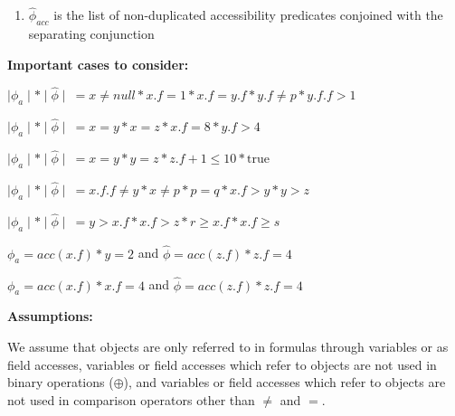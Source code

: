 \documentclass {article}
\newcommand{\true}{\text{true}}
\newcommand{\fphi}{\widehat{\phi}}
\begin{document}
\begin{enumerate}
\begin{enumerate}
	\end{enumerate}
\item $\fphi_{acc}$ is the list of non-duplicated accessibility predicates conjoined with the separating conjunction
\end{enumerate}

\textbf{Important cases to consider:}

$\mid \phi_a \mid \ast \mid \fphi \mid \ = x \neq null \ast x.f = 1 \ast x.f = y.f \ast y.f \neq p \ast y.f.f > 1$

$\mid \phi_a \mid \ast \mid \fphi \mid \ = x = y \ast x = z \ast x.f = 8 \ast y.f > 4$

$\mid \phi_a \mid \ast \mid \fphi \mid \ = x = y \ast y = z \ast z.f + 1 \leq 10 \ast \true$

$\mid \phi_a \mid \ast \mid \fphi \mid \ = x.f.f \neq y \ast x \neq p \ast p = q \ast x.f > y \ast y > z$

$\mid \phi_a \mid \ast \mid \fphi \mid \ = y > x.f \ast x.f > z \ast r \geq x.f \ast x.f \geq s$

$\phi_a = acc(x.f) \ast y = 2$ and $\fphi = acc(z.f) \ast z.f = 4$

$\phi_a = acc(x.f) \ast x.f = 4$ and $\fphi = acc(z.f) \ast z.f = 4$

\textbf{Assumptions:}

We assume that objects are only referred to in formulas through variables or as field accesses, variables or field accesses which refer to objects are not used in binary operations ($\oplus$), and variables or field accesses which refer to objects are not used in comparison operators other than $\neq$ and $=$.
\end{document}

